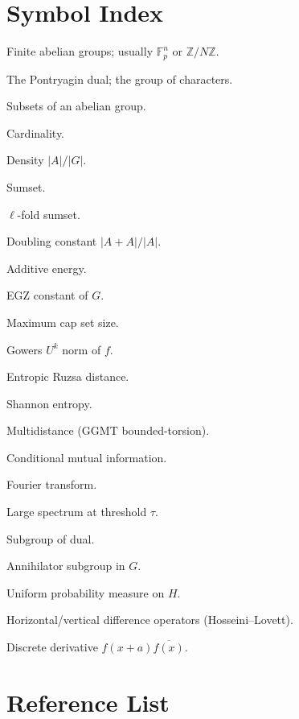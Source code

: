 \documentclass[11pt,a4paper]{article}
\theoremstyle{plain}
\theoremstyle{definition}
\theoremstyle{remark}
\newcommand{\F}{\mathbb{F}}
\newcommand{\Z}{\mathbb{Z}}
\newcommand{\entropy}{\mathbf{H}}
\newcommand{\sUFp}{\mathfrak{s}}
\newcommand{\Spec}{\mathrm{Spec}}
\newcommand{\dist}{d}
\begin{document}
\section{Symbol Index}

\begin{description}[leftmargin=0pt, itemsep=3pt]
\item[$G$, $H$] Finite abelian groups; usually $\F_p^n$ or $\Z/N\Z$.
\item[$\widehat{G}$] The Pontryagin dual; the group of characters.
\item[$A, B$] Subsets of an abelian group.
\item[$|A|$] Cardinality.
\item[$\alpha$] Density $|A|/|G|$.
\item[$A + B$] Sumset.
\item[$\ell A$] $\ell$-fold sumset.
\item[$K$] Doubling constant $|A + A|/|A|$.
\item[$E(A)$] Additive energy.
\item[$\sUFp(G)$] EGZ constant of $G$.
\item[$r(\F_p^n)$] Maximum cap set size.
\item[$\|f\|_{U^k}$] Gowers $U^k$ norm of $f$.
\item[{$\dist[X; Y]$}] Entropic Ruzsa distance.
\item[{$\entropy[X]$}] Shannon entropy.
\item[{$D[X_1, \ldots, X_m]$}] Multidistance (GGMT bounded-torsion).
\item[{$I[X : Y | Z]$}] Conditional mutual information.
\item[$\widehat{f}(\xi)$] Fourier transform.
\item[$\Spec_0(A)$] Large spectrum at threshold $\tau$.
\item[$V \leq \widehat{G}$] Subgroup of dual.
\item[$H = V^\perp$] Annihilator subgroup in $G$.
\item[$\mu_H$] Uniform probability measure on $H$.
\item[$\phi_h$, $\phi_v$] Horizontal/vertical difference operators (Hosseini--Lovett).
\item[$\partial_a f$] Discrete derivative $f(x+a)\overline{f(x)}$.
\end{description}

\section{Reference List}
\end{document}
